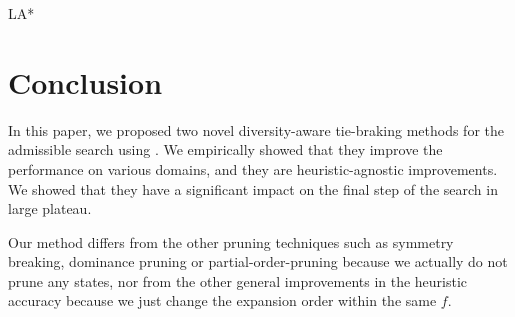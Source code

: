 LA*

\section{Conclusion}

In this paper, we proposed two novel diversity-aware tie-braking methods for the admissible search using \astar. We empirically showed that they improve the performance on various domains, and they are heuristic-agnostic improvements. We showed that they have a significant impact on the final step of the search in large plateau.

Our method differs from the other pruning techniques such as symmetry breaking, dominance pruning or partial-order-pruning because we actually do not prune any states, nor from the other general improvements in the heuristic accuracy because we just change the expansion order within the same $f$.
